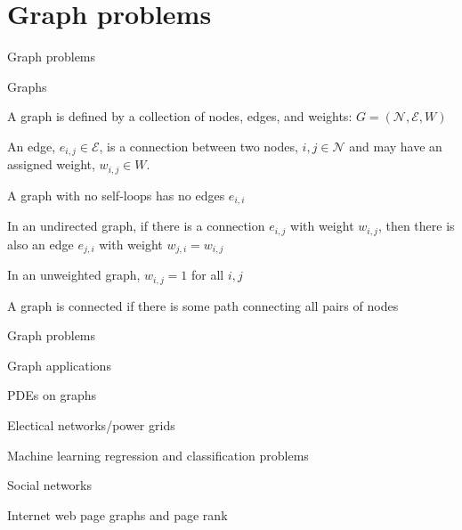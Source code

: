 \documentclass[18pt,xcolor=table]{beamer}
\begin{document}



\section{Graph problems}

\begin{frame}{Graph problems}
\begin{block}{Graphs}
\bit
\item A graph is defined by a collection of nodes, edges, and weights: $G = (\mathcal{N},\mathcal{E},W)$
\item An edge, $e_{i,j}\in\mathcal{E}$, is a connection between two nodes, $i,j\in\mathcal{N}$ and may have an assigned weight, $w_{i,j}\in W$.
\item A graph with no self-loops has no edges $e_{i,i}$
\item In an undirected graph, if there is a connection $e_{i,j}$ with weight $w_{i,j}$, then there is also an edge $e_{j,i}$ with weight $w_{j,i} = w_{i,j}$
\item In an unweighted graph, $w_{i,j} = 1$ for all $i,j$
\item A graph is connected if there is some path connecting all pairs of nodes
\eit
\end{block}
\end{frame}

\begin{frame}{Graph problems}
\begin{block}{Graph applications}
\bit
\item PDEs on graphs
\item Electical networks/power grids
\item Machine learning regression and classification problems
\item Social networks
\item Internet web page graphs and page rank
\eit
\end{block}
\end{frame}
\end{document}
